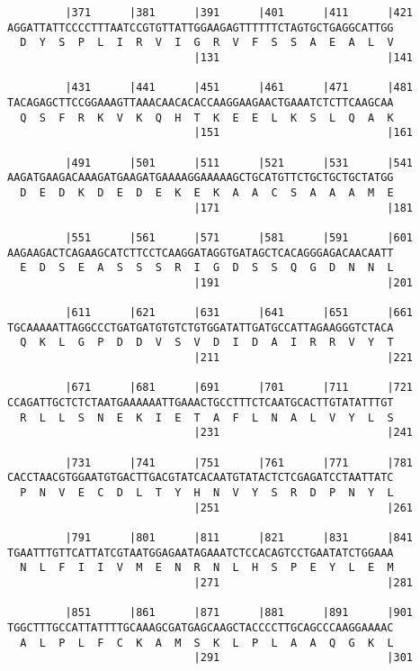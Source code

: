 \documentclass{article}
\begin{document}
\begin{Verbatim}
         |371      |381      |391      |401      |411      |421
AGGATTATTCCCCTTTAATCCGTGTTATTGGAAGAGTTTTTTCTAGTGCTGAGGCATTGG
  D  Y  S  P  L  I  R  V  I  G  R  V  F  S  S  A  E  A  L  V
                             |131                          |141
  
         |431      |441      |451      |461      |471      |481
TACAGAGCTTCCGGAAAGTTAAACAACACACCAAGGAAGAACTGAAATCTCTTCAAGCAA
  Q  S  F  R  K  V  K  Q  H  T  K  E  E  L  K  S  L  Q  A  K
                             |151                          |161
  
         |491      |501      |511      |521      |531      |541
AAGATGAAGACAAAGATGAAGATGAAAAGGAAAAAGCTGCATGTTCTGCTGCTGCTATGG
  D  E  D  K  D  E  D  E  K  E  K  A  A  C  S  A  A  A  M  E
                             |171                          |181
  
         |551      |561      |571      |581      |591      |601
AAGAAGACTCAGAAGCATCTTCCTCAAGGATAGGTGATAGCTCACAGGGAGACAACAATT
  E  D  S  E  A  S  S  S  R  I  G  D  S  S  Q  G  D  N  N  L
                             |191                          |201
  
         |611      |621      |631      |641      |651      |661
TGCAAAAATTAGGCCCTGATGATGTGTCTGTGGATATTGATGCCATTAGAAGGGTCTACA
  Q  K  L  G  P  D  D  V  S  V  D  I  D  A  I  R  R  V  Y  T
                             |211                          |221
  
         |671      |681      |691      |701      |711      |721
CCAGATTGCTCTCTAATGAAAAAATTGAAACTGCCTTTCTCAATGCACTTGTATATTTGT
  R  L  L  S  N  E  K  I  E  T  A  F  L  N  A  L  V  Y  L  S
                             |231                          |241
  
         |731      |741      |751      |761      |771      |781
CACCTAACGTGGAATGTGACTTGACGTATCACAATGTATACTCTCGAGATCCTAATTATC
  P  N  V  E  C  D  L  T  Y  H  N  V  Y  S  R  D  P  N  Y  L
                             |251                          |261
  
         |791      |801      |811      |821      |831      |841
TGAATTTGTTCATTATCGTAATGGAGAATAGAAATCTCCACAGTCCTGAATATCTGGAAA
  N  L  F  I  I  V  M  E  N  R  N  L  H  S  P  E  Y  L  E  M
                             |271                          |281
  
         |851      |861      |871      |881      |891      |901
TGGCTTTGCCATTATTTTGCAAAGCGATGAGCAAGCTACCCCTTGCAGCCCAAGGAAAAC
  A  L  P  L  F  C  K  A  M  S  K  L  P  L  A  A  Q  G  K  L
                             |291                          |301
  

\end{Verbatim}
\end{document}
